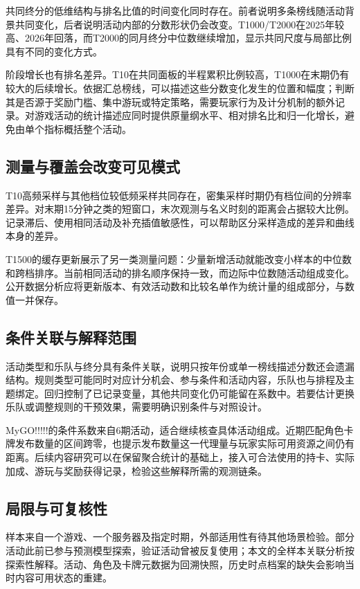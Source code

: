 \documentclass[preprint,12pt]{elsarticle}
\begin{document}
共同终分的低维结构与排名比值的时间变化同时存在。前者说明多条榜线随活动背景共同变化，后者说明活动内部的分数形状仍会改变。T1000/T2000在2025年较高、2026年回落，而T2000的同月终分中位数继续增加，显示共同尺度与局部比例具有不同的变化方式。

阶段增长也有排名差异。T10在共同面板的半程累积比例较高，T1000在末期仍有较大的后续增长。依据汇总榜线，可以描述这些分数变化发生的位置和幅度；判断其是否源于奖励门槛、集中游玩或特定策略，需要玩家行为及计分机制的额外记录。对游戏活动的统计描述应同时提供原量纲水平、相对排名比和归一化增长，避免由单个指标概括整个活动。

\subsection{测量与覆盖会改变可见模式}

T10高频采样与其他档位较低频采样共同存在，密集采样时期仍有档位间的分辨率差异。对末期15分钟之类的短窗口，末次观测与名义时刻的距离会占据较大比例。记录滞后、使用相同活动及补充插值敏感性，可以帮助区分采样造成的差异和曲线本身的差异。

T1500的缓存更新展示了另一类测量问题：少量新增活动就能改变小样本的中位数和跨档排序。当前相同活动的排名顺序保持一致，而边际中位数随活动组成变化。公开数据分析应将更新版本、有效活动数和比较名单作为统计量的组成部分，与数值一并保存。

\subsection{条件关联与解释范围}

活动类型和乐队与终分具有条件关联，说明只按年份或单一榜线描述分数还会遗漏结构。规则类型可能同时对应计分机会、参与条件和活动内容，乐队也与排程及主题绑定。回归控制了已记录变量，其他共同变化仍可能留在系数中。若要估计更换乐队或调整规则的干预效果，需要明确识别条件与对照设计\citep{hernan2020}。

MyGO!!!!!的条件系数来自6期活动，适合继续核查具体活动组成。近期匹配角色卡牌发布数量的区间跨零，也提示发布数量这一代理量与玩家实际可用资源之间仍有距离。后续内容研究可以在保留聚合统计的基础上，接入可合法使用的持卡、实际加成、游玩与奖励获得记录，检验这些解释所需的观测链条。

\subsection{局限与可复核性}

样本来自一个游戏、一个服务器及指定时期，外部适用性有待其他场景检验。部分活动此前已参与预测模型探索，验证活动曾被反复使用；本文的全样本关联分析按探索性解释。活动、角色及卡牌元数据为回溯快照，历史时点档案的缺失会影响当时内容可用状态的重建。
\end{document}
